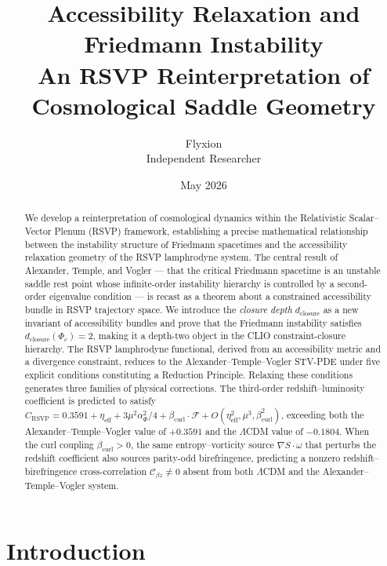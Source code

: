 \documentclass[12pt,a4paper]{article}
\title{%
  \LARGE\bfseries
  Accessibility Relaxation and Friedmann Instability\\[6pt]
  \large
  An RSVP Reinterpretation of Cosmological Saddle Geometry
}
\author{
  Flyxion\\[4pt]
  \normalsize Independent Researcher
}
\date{May 2026}
\theoremstyle{plain}
\theoremstyle{definition}
\theoremstyle{remark}
\newcommand{\Phic}{\Phi_c}
\newcommand{\dclos}{d_{\mathrm{closure}}}
\newcommand{\etaeff}{\eta_{\mathrm{eff}}}
\newcommand{\Cbz}{\mathcal{C}_{\beta z}}
\newcommand{\bcurl}{\beta_{\mathrm{curl}}}
\begin{document}
\maketitle

\begin{abstract}
We develop a reinterpretation of cosmological dynamics within the Relativistic
Scalar--Vector Plenum (RSVP) framework, establishing a precise mathematical
relationship between the instability structure of Friedmann spacetimes and the
accessibility relaxation geometry of the RSVP lamphrodyne system. The central
result of Alexander, Temple, and Vogler --- that the critical Friedmann spacetime
is an unstable saddle rest point whose infinite-order instability hierarchy is
controlled by a second-order eigenvalue condition --- is recast as a theorem about
a constrained accessibility bundle in RSVP trajectory space. We introduce the
\emph{closure depth} $\dclos$ as a new invariant of accessibility bundles and
prove that the Friedmann instability satisfies $\dclos(\Phic) = 2$, making it a
depth-two object in the CLIO constraint-closure hierarchy. The RSVP lamphrodyne
functional, derived from an accessibility metric and a divergence constraint,
reduces to the Alexander--Temple--Vogler STV-PDE under five explicit conditions
constituting a Reduction Principle. Relaxing these conditions generates three
families of physical corrections. The third-order redshift--luminosity coefficient
is predicted to satisfy $C_{\mathrm{RSVP}} = 0.3591 + \etaeff + 3\mu^2\alpha_\Phi^2/4
+ \bcurl\cdot\mathcal{F} + O(\etaeff^2,\mu^3,\bcurl^2)$, exceeding both the
Alexander--Temple--Vogler value of $+0.3591$ and the $\Lambda$CDM value of
$-0.1804$. When the curl coupling $\bcurl > 0$, the same entropy--vorticity source
$\nabla S\cdot\omega$ that perturbs the redshift coefficient also sources parity-odd
birefringence, predicting a nonzero redshift--birefringence cross-correlation
$\Cbz \neq 0$ absent from both $\Lambda$CDM and the Alexander--Temple--Vogler
system.
\end{abstract}

\tableofcontents
\newpage

\section{Introduction}
\label{sec:intro}
\end{document}
